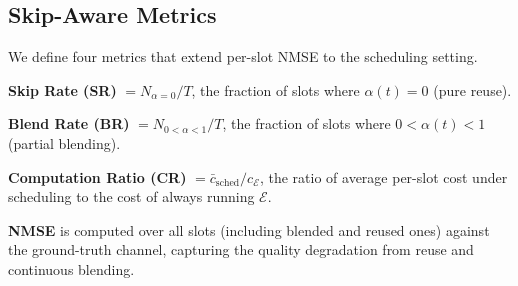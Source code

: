 \subsection{Skip-Aware Metrics}

We define four metrics that extend per-slot NMSE to the scheduling setting.

\textbf{Skip Rate (SR)} $= N_{\alpha=0} / T$, the fraction of slots where $\alpha(t) = 0$ (pure reuse).

\textbf{Blend Rate (BR)} $= N_{0 < \alpha < 1} / T$, the fraction of slots where $0 < \alpha(t) < 1$ (partial blending).

\textbf{Computation Ratio (CR)} $= \bar{c}_{\text{sched}} / c_{\mathcal{E}}$, the ratio of average per-slot cost under scheduling to the cost of always running $\mathcal{E}$.

\textbf{NMSE} is computed over all slots (including blended and reused ones) against the ground-truth channel, capturing the quality degradation from reuse and continuous blending.
